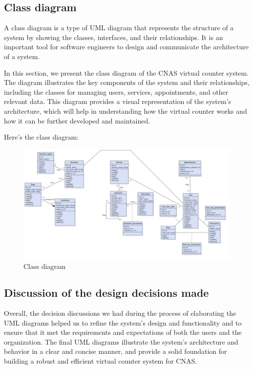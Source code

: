 \subsection{Class diagram}
A class diagram is a type of UML diagram that represents the structure of a system by showing the classes, interfaces, and their relationships. It is an important tool for software engineers to design and communicate the architecture of a system. 

\medskip In this section, we present the class diagram of the CNAS virtual counter system. The diagram illustrates the key components of the system and their relationships, including the classes for managing users, services, appointments, and other relevant data. This diagram provides a visual representation of the system's architecture, which will help in understanding how the virtual counter works and how it can be further developed and maintained.

\bigskip Here's the class diagram:
\begin{figure}[H]
    \centering
    \includegraphics[width=1.1\textwidth]{ClassDiagram.png}
    \caption{Class diagram}
    \label{classdiagram}
\end{figure}
\newpage

\subsection{Discussion of the design decisions made}
Overall, the decision discussions we had during the process of elaborating the UML diagrams helped us to refine the system's design and functionality and to ensure that it met the requirements and expectations of both the users and the organization. The final UML diagrams illustrate the system's architecture and behavior in a clear and concise manner, and provide a solid foundation for building a robust and efficient virtual counter system for CNAS.

